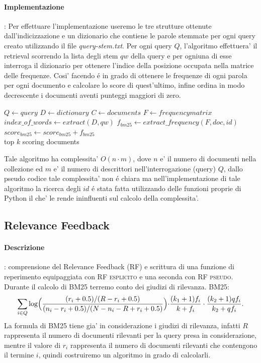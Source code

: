\paragraph{\textbf{Implementazione}}: 
Per effettuare l'implementazione useremo le tre strutture ottenute dall'indicizzazione e un dizionario che contiene le parole stemmate per ogni query creato utilizzando il file \textit{query-stem.txt}. Per ogni query $Q$, l'algoritmo effettuera' il retrieval scorrendo la lista degli stem $qw$ della query e per ogniuna di esse interroga il dizionario per ottenere l'indice della posizione occupata nella matrice delle frequenze. Cosi' facendo \'e in grado di ottenere le frequenze di ogni parola per ogni documento e calcolare lo score di quest'ultimo, infine ordina in modo decrescente i documenti aventi punteggi maggiori di zero.
\begin{algorithmic}
\State $Q \gets query$
\State $D \gets dictionary$
\State $C \gets documents$
\State $F \gets frequency matrix$
	\State $index\_of\_words \gets extract(D,qw)$
			\State $f_{bm25} \gets extract\_frequency(F,doc,id)$
		\EndFor
		\State $score_{bm25} \gets score_{bm25} + f_{bm25}$
	\EndFor
\EndFor\\
\Return top $k$ scoring documents
\end{algorithmic}
Tale algoritmo ha complessita' $O(n \cdot m)$, dove $n$ e' il numero di documenti nella collezione ed $m$ e' il numero di descrittori nell'interrogazione (query) $Q$, dallo pseudo codice tale complessita' non \'e chiara ma nell'implementazione di tale algoritmo la ricerca degli $id$ \'e stata fatta utilizzando delle funzioni proprie di Python il che' le rende ininfluenti sul calcolo della complessita'. 

\subsection{Relevance Feedback}
\label{sec:relevance-feedback}

\paragraph{\textbf{Descrizione}}: comprensione del Relevance Feedback (\textsc{RF}) e scrittura di una funzione di reperimento equipaggiata con \textsc{RF esplicito} e una seconda con \textsc{RF pseudo}.
Durante il calcolo di \textsc{BM25} terremo conto dei giudizi di rilevanza.
BM25:
\[ \sum\limits_{i \in Q}\log\Bigl(\frac{(r_i+0.5)/(R-r_i+0.5)}{(n_i-r_i+0.5)/(N-n_i-R+r_i+0.5)}\Bigl)\cdot\frac{(k_1+1)f_i}{k+f_i}\cdot\frac{(k_2+1)qf_i}{k_2+qf_i}. \]
La formula di BM25 tiene gia' in considerazione i giudizi di rilevanza, infatti $R$ rappresenta il numero di documenti rilevanti per la query presa in considerazione, mentre il valore di $r_i$ rappresenta il numero di documenti rilevanti che contengono il termine $i$, quindi costruiremo un algoritmo in grado di calcolarli.

